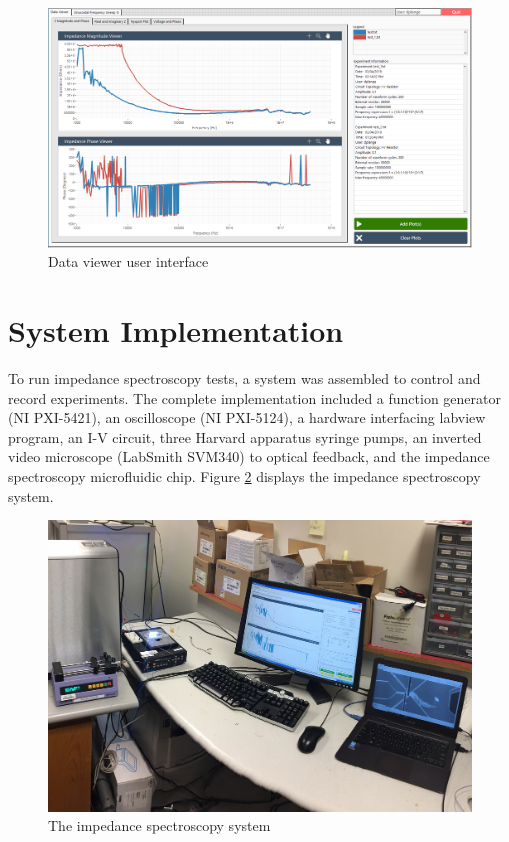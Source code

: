 \begin{figure}[h]
    \centering
    \includegraphics[width=\textwidth]{images/labview_dataViewer.png}
    \caption{Data viewer user interface}
    \label{fig:labview_data_viewer_gui}
\end{figure}

\section{System Implementation}
\par To run impedance spectroscopy tests, a system was assembled to control and record experiments. The complete implementation included a function generator (NI PXI-5421), an oscilloscope (NI PXI-5124), a hardware interfacing labview program, an I-V circuit, three Harvard apparatus syringe pumps, an inverted video microscope (LabSmith SVM340) to optical feedback, and the impedance spectroscopy microfluidic chip. Figure \ref{fig:IS_system} displays the impedance spectroscopy system. 

\begin{figure}[h]
    \centering
    \includegraphics[width=\textwidth]{images/impedance_system}
    \caption{The impedance spectroscopy system}
    \label{fig:IS_system}
\end{figure}

